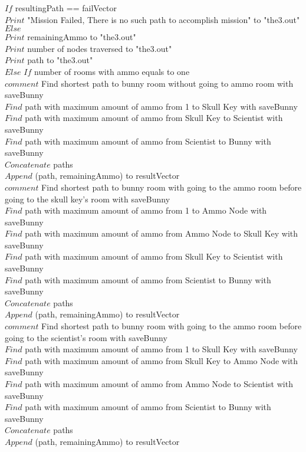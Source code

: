 \documentclass[10pt]{article}
\begin{document}
		$If$ resultingPath == failVector \\
			$Print$ "Mission Failed, There is no such path to accomplish mission" to "the3.out"  \\
 
		$Else$ \\
			$Print$ remainingAmmo to "the3.out" \\
			$Print$ number of nodes traversed to "the3.out" \\
			$Print$ path to "the3.out" \\

	$Else$ $If$ number of rooms with ammo equals to one \\

		$comment$  Find shortest path to bunny room without going to ammo room with saveBunny \\
		 $Find$ path with maximum amount of ammo from 1 to Skull Key with saveBunny  \\
		 $Find$ path with maximum amount of ammo from Skull Key to Scientist with saveBunny \\
		 $Find$ path with maximum amount of ammo from Scientist to Bunny with saveBunny \\
		$Concatenate$ paths  \\
		$Append$ (path, remainingAmmo) to resultVector \\

		$comment$  Find shortest path to bunny room with going to the ammo room before going to the skull key's room with saveBunny \\
		 $Find$ path with maximum amount of ammo from 1 to Ammo Node with saveBunny  \\
		 $Find$ path with maximum amount of ammo from Ammo Node to Skull Key with saveBunny  \\
		 $Find$ path with maximum amount of ammo from Skull Key to Scientist with saveBunny \\
		 $Find$ path with maximum amount of ammo from Scientist to Bunny with saveBunny \\
		$Concatenate$ paths  \\
		$Append$ (path, remainingAmmo) to resultVector \\

		$comment$  Find shortest path to bunny room with going to the ammo room before going to the scientist's room with saveBunny \\
		 $Find$ path with maximum amount of ammo from 1 to Skull Key with saveBunny  \\
		 $Find$ path with maximum amount of ammo from Skull Key to Ammo Node with saveBunny \\
		 $Find$ path with maximum amount of ammo from Ammo Node to Scientist with saveBunny \\
		 $Find$ path with maximum amount of ammo from Scientist to Bunny with saveBunny \\
		$Concatenate$ paths  \\
		$Append$ (path, remainingAmmo) to resultVector \\
\end{document}

